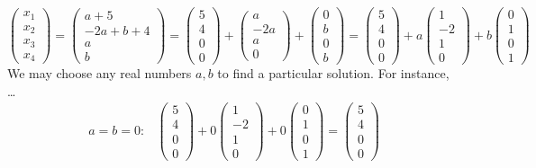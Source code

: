 \documentclass[12pt,letterpaper]{exam}
\begin{document}
\begin{questions}
{\[	\begin{pmatrix} x_1 \\ x_2 \\ x_3 \\ x_4 \end{pmatrix}= \begin{pmatrix} a + 5 \\ -2a + b + 4 \\ a \\ b \end{pmatrix}= \begin{pmatrix} 5 \\ 4 \\ 0 \\ 0 \end{pmatrix} + \begin{pmatrix} a \\ -2a \\ a \\ 0 \end{pmatrix} + \begin{pmatrix} 0 \\ b \\ 0 \\ b \end{pmatrix}= \boxed{\begin{pmatrix} 5 \\ 4 \\ 0 \\ 0 \end{pmatrix} + a \begin{pmatrix} 1 \\ -2 \\ 1 \\ 0 \end{pmatrix} + b \begin{pmatrix} 0 \\ 1 \\ 0 \\ 1 \end{pmatrix}}
	\]
We may choose any real numbers $a, b$ to find a particular solution. For instance, \dots
	\[
	\begin{aligned}
	a=b=0 \colon& \begin{pmatrix} 5 \\ 4 \\ 0 \\ 0 \end{pmatrix} + 0 \begin{pmatrix} 1 \\ -2 \\ 1 \\ 0 \end{pmatrix} + 0 \begin{pmatrix} 0 \\ 1 \\ 0 \\ 1 \end{pmatrix}= \begin{pmatrix} 5 \\ 4 \\ 0 \\ 0 \end{pmatrix} \\[0.2cm]

\end{aligned}\]}
\end{questions}
\end{document}
